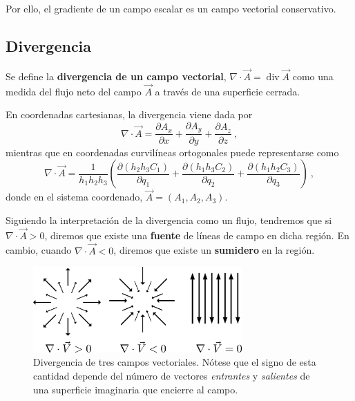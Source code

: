 Por ello, el gradiente de un campo escalar es un campo vectorial conservativo.

\subsection{Divergencia}

\begin{defi}
    Se define la \textbf{divergencia de un campo vectorial}, $\nabla \cdot \vec{A} = \operatorname{div} \vec{A}$ como una medida del flujo neto del campo $\vec{A}$ a través de una superficie cerrada.
\end{defi}

En coordenadas cartesianas, la divergencia viene dada por
\begin{equation}
    \nabla \cdot \vec{A} = \frac{\partial A_x}{\partial x} + \frac{\partial A_y}{\partial y} + \frac{\partial A_z}{\partial z} \ ,
\end{equation}
mientras que en coordenadas curvilíneas ortogonales puede representarse como 
\begin{equation}
    \nabla \cdot \vec{A} = \frac{1}{h_1 h_2 h_3} \left( \frac{\partial(h_2 h_3 C_1)}{\partial q_1} + \frac{\partial(h_1 h_3 C_2)}{\partial q_2} + \frac{\partial(h_1 h_2 C_3)}{\partial q_3} \right) \ ,
\end{equation}
donde en el sistema coordenado, $\vec{A} = (A_1, A_2, A_3)$.

Siguiendo la interpretación de la divergencia como un flujo, tendremos que si $\nabla \cdot \vec{A} > 0$, diremos que existe una \textbf{fuente} de líneas de campo en dicha región. En cambio, cuando $\nabla \cdot \vec{A} < 0$, diremos que existe un \textbf{sumidero} en la región.

\begin{figure}[htbp]
    \centering
    \includegraphics[width=8cm]{Figuras/Divergence.png}
    \caption{Divergencia de tres campos vectoriales. Nótese que el signo de esta cantidad depende del número de vectores \emph{entrantes} y \emph{salientes} de una superficie imaginaria que encierre al campo.}
\end{figure}

